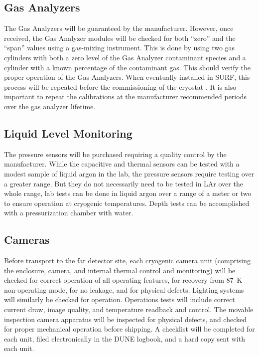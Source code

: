 \subsection{Gas Analyzers}
\label{sec:fdgen-slow-cryo-qc-ga}

The Gas Analyzers will be guaranteed by the manufacturer. However, once received, the Gas Analyzer modules will be checked for both ``zero'' and the ``span'' values using a gas-mixing instrument. This is done by using two gas cylinders with both a zero level of the Gas Analyzer contaminant species and a cylinder with a known percentage of the contaminant gas. This should verify the proper operation of the Gas Analyzers. When eventually installed in SURF, this process will be repeated before the commissioning of the cryostat . It is also important to repeat the calibrations at the manufacturer recommended periods over the gas analyzer lifetime.
 

\subsection{Liquid Level Monitoring}
\label{sec:fdgen-slow-cryo-qc-llm}

The pressure sensors will be purchased requiring a quality control by the manufacturer.
While the capacitive and thermal sensors can be tested with a modest sample of liquid argon in the lab,
the pressure sensors require testing over a greater range.  But they do not
necessarily need to be tested in LAr over the whole range,  lab tests
can be done in liquid argon over a range of a meter or two to ensure operation
at cryogenic temperatures.  Depth tests can be accomplished with a
pressurization chamber with water.

\subsection{Cameras}
\label{sec:fdgen-slow-cryo-qc-c}

Before transport to the far detector site, each cryogenic camera unit (comprising the enclosure, camera, and internal thermal control and monitoring) will be checked for correct operation of all operating features, for recovery from \SI{87}{K} non-operating mode, for no leakage, and for physical defects. Lighting systems will similarly be checked for operation. Operations tests will include correct current draw, image quality, and temperature readback and control. The movable inspection camera apparatus will be inspected for physical defects, and checked for proper mechanical operation before shipping. A checklist will be completed for each unit, filed electronically in the DUNE logbook, and a hard copy sent with each unit. 

